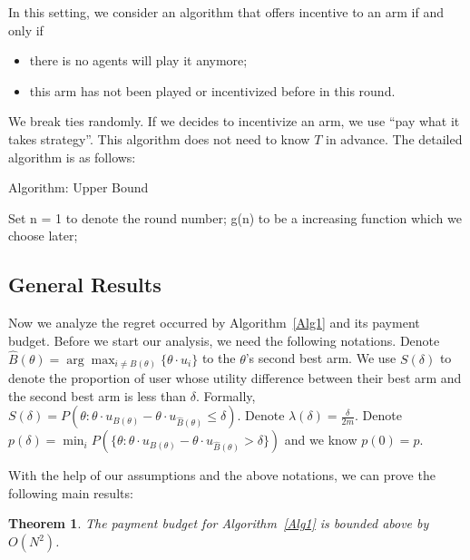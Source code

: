 \documentclass{article}
\newtheorem{theorem}{Theorem}
\begin{document}
In this setting, we consider an algorithm that offers incentive to an arm if and only if 
\begin{itemize}
\item there is no agents will play it anymore;
\item this arm has not been played or incentivized before in this round.
\end{itemize}
We break ties randomly. If we decides to incentivize an arm, we use ``pay what it takes strategy''. This algorithm does not need to know $T$ in advance. The detailed algorithm is as follows:

\begin{algorithm}
\caption{Algorithm: Upper Bound}
\label{Alg1}
\begin{algorithmic}
\STATE Set n = 1 to denote the round number; g(n) to be a increasing function which we choose later;
\ENDFOR

\end{algorithmic}
\end{algorithm}


\subsection{General Results}

Now we analyze the regret occurred by Algorithm~\ref{Alg1} and its payment budget. Before we start our analysis, we need the following notations. Denote $\hat{B}(\theta)=\arg\max_{i\neq B(\theta)}\{\theta\cdot u_{i}\}$ to the $\theta$'s second best arm. We use $S(\delta)$ to denote the proportion of user whose utility difference between their best arm and the second best arm is less than $\delta$. Formally, $S(\delta)=P(\theta: \theta \cdot u_{B(\theta)}-\theta\cdot u_{\hat{B}(\theta)}\leq \delta)$. Denote $\lambda(\delta)=\frac{\delta}{2m}$.  Denote $p(\delta)=\min_{i}P(\{\theta:\theta\cdot u_{B(\theta)}-\theta\cdot u_{\hat{B}(\theta)}>\delta\})$ and we know $p(0)=p$. 

With the help of our assumptions and the above notations, we can prove the following main results:

\begin{theorem}
The payment budget for Algorithm~\ref{Alg1} is bounded above by $O(N^2)$.
\label{rst:budget}
\end{theorem}
\end{document}
